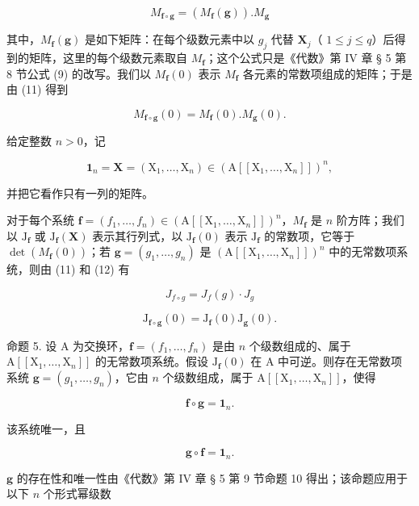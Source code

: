 \[
M _ {\mathbf {f} \circ \mathbf {g}} = (M _ {\mathbf {f}} (\mathbf {g})). M _ {\mathbf {g}}\tag{11}
\]

其中，\(M_{\mathbf{f}}(\mathbf{g})\) 是如下矩阵：在每个级数元素中以 \(g_j\) 代替 \(\mathbf{X}_j\)（ \(1 \leqslant j \leqslant q\)）后得到的矩阵，这里的每个级数元素取自 \(M_{\mathbf{f}}\)；这个公式只是《代数》第 IV 章 § 5 第 8 节公式 (9) 的改写。我们以 \(M_{\mathbf{f}}(0)\) 表示 \(M_{\mathbf{f}}\) 各元素的常数项组成的矩阵；于是由 (11) 得到

\[
M _ {\mathbf {f} \circ \mathbf {g}} (0) = M _ {\mathbf {f}} (0). M _ {\mathbf {g}} (0).\tag{12}
\]

给定整数 \(n > 0\)，记

\[
\mathbf {1} _ {n} = \mathbf {X} = (\mathrm{X} _ {1}, \dots , \mathrm{X} _ {n}) \in (\mathrm{A} [ [ \mathrm{X} _ {1}, \dots , \mathrm{X} _ {n} ] ]) ^ {n},\tag{13}
\]

并把它看作只有一列的矩阵。

对于每个系统 \(\mathbf{f} = (f_1, \ldots, f_n) \in (\mathrm{A}[[\mathrm{X}_1, \ldots, \mathrm{X}_n]])^n\)，\(M_{\mathbf{f}}\) 是 \(n\) 阶方阵；我们以 \(\mathrm{J}_{\mathbf{f}}\) 或 \(\mathrm{J}_{\mathbf{f}}(\mathbf{X})\) 表示其行列式，以 \(\mathrm{J}_{\mathbf{f}}(0)\) 表示 \(\mathrm{J}_{\mathbf{f}}\) 的常数项，它等于 \(\det(M_{\mathbf{f}}(0))\)；若 \(\mathbf{g} = (g_1, \ldots, g_n)\) 是 \((\mathrm{A}[[\mathrm{X}_1, \ldots, \mathrm{X}_n]])^n\) 中的无常数项系统，则由 (11) 和 (12) 有

\[
J _ {f \circ g} = J _ {f} (g) \cdot J _ {g}\tag{14}
\]

\[
\mathrm{J} _ {\mathbf {f} \circ \mathbf {g}} (0) = \mathrm{J} _ {\mathbf {f}} (0) \mathrm{J} _ {\mathbf {g}} (0).\tag{15}
\]

命题 5. 设 A 为交换环，\(\mathbf{f} = (f_1, \ldots, f_n)\) 是由 \(n\) 个级数组成的、属于 \(\mathrm{A}[[\mathrm{X}_1, \ldots, \mathrm{X}_n]]\) 的无常数项系统。假设 \(\mathrm{J}_{\mathbf{f}}(0)\) 在 A 中可逆。则存在无常数项系统 \(\mathbf{g} = (g_1, \ldots, g_n)\)，它由 \(n\) 个级数组成，属于 \(\mathrm{A}[[\mathrm{X}_1, \ldots, \mathrm{X}_n]]\)，使得

\[
\mathbf {f} \circ \mathbf {g} = \mathbf {1} _ {n}.\tag{16}
\]

该系统唯一，且

\[
\mathbf {g} \circ \mathbf {f} = \mathbf {1} _ {n}.\tag{17}
\]

\(\mathbf{g}\) 的存在性和唯一性由《代数》第 IV 章 § 5 第 9 节命题 10 得出；该命题应用于以下 \(n\) 个形式幂级数

